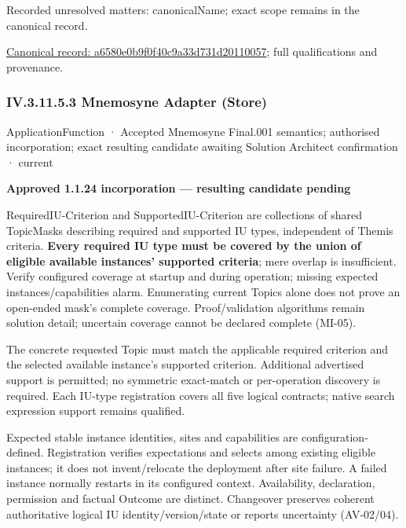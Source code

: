 {\small Recorded unresolved matters: canonicalName; exact scope remains in the canonical record.}\par
{\footnotesize \href{../../../../../../../continuum/application/application-function/a6580e0b9f0f40c9a33d731d20110057.md}{Canonical record: a6580e0b9f0f40c9a33d731d20110057}; full qualifications and provenance.}\par
\subsubsection*{IV.3.11.5.3 Mnemosyne Adapter (Store)}
\label{navigation:IV.3.11.5.3}

\label{element:9c680d56a6b943da8ff22f3264e19bc7}
{\small ApplicationFunction · Accepted Mnemosyne Final.001 semantics; authorised incorporation; exact resulting candidate awaiting Solution Architect confirmation · current}\par

\par\medskip\textbf{Approved 1.1.24 incorporation — resulting candidate pending}\par


RequiredIU-Criterion and SupportedIU-Criterion are collections of shared TopicMasks describing required and supported IU types, independent of Themis criteria. \textbf{Every required IU type must be covered by the union of eligible available instances' supported criteria}; mere overlap is insufficient. Verify configured coverage at startup and during operation; missing expected instances/capabilities alarm. Enumerating current Topics alone does not prove an open-ended mask's complete coverage. Proof/validation algorithms remain solution detail; uncertain coverage cannot be declared complete (MI-05).



The concrete requested Topic must match the applicable required criterion and the selected available instance's supported criterion. Additional advertised support is permitted; no symmetric exact-match or per-operation discovery is required. Each IU-type registration covers all five logical contracts; native search expression support remains qualified.



Expected stable instance identities, sites and capabilities are configuration-defined. Registration verifies expectations and selects among existing eligible instances; it does not invent/relocate the deployment after site failure. A failed instance normally restarts in its configured context. Availability, declaration, permission and factual Outcome are distinct. Changeover preserves coherent authoritative logical IU identity/version/state or reports uncertainty (AV-02/04).



